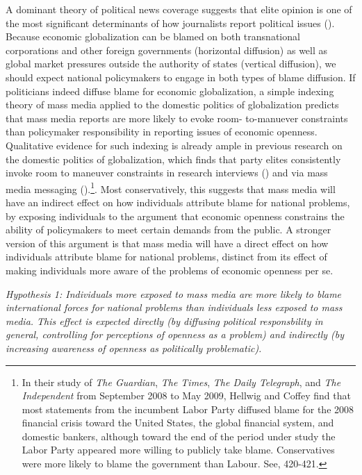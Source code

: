 \documentclass[12pt]{report}
\begin{document}
A dominant theory of political news coverage suggests that elite opinion is one of the most
significant determinants of how journalists report political issues
(\citealt{Bennett:1990bp,Zaller:1996vs,Bennett:2006gc}). Because economic globalization can be
blamed on both transnational corporations and other foreign governments (horizontal diffusion) as
well as global market pressures outside the authority of states (vertical diffusion), we should
expect national policymakers to engage in both types of blame diffusion. If politicians indeed
diffuse blame for economic globalization, a simple indexing theory of mass media applied to the
domestic politics of globalization predicts that mass media reports are more likely to evoke room-
to-manuever constraints than policymaker responsibility in reporting issues of economic openness.
Qualitative evidence for such indexing is already ample in previous research on the domestic
politics of globalization, which finds that party elites consistently invoke room to maneuver
constraints in research interviews (\citealt[206-07]{Hellwig:2012vk}) and via mass media messaging
(\citealt{Hellwig:2011iu}).\footnote{In their study of \emph{The Guardian}, \emph{The Times}, \emph{The Daily
Telegraph}, and \emph{The Independent} from September 2008 to May 2009, Hellwig and Coffey find that most
statements from the incumbent Labor Party diffused blame for the 2008 financial crisis toward the
United States, the global financial system, and domestic bankers, although toward the end of the
period under study the Labor Party appeared more willing to publicly take blame. Conservatives were
more likely to blame the government than Labour. See\citealt{Hellwig:2011iu}, 420-421.}. Most
conservatively, this suggests that mass media will have an indirect effect on how individuals
attribute blame for national problems, by exposing individuals to the argument that economic
openness constrains the ability of policymakers to meet certain demands from the public. A stronger
version of this argument is that mass media will have a direct effect on how individuals attribute
blame for national problems, distinct from its effect of making individuals more aware of the
problems of economic openness per se.

\emph{Hypothesis 1: Individuals more exposed to mass media are more likely to blame international
forces for national problems than individuals less exposed to mass media. This effect is expected
directly (by diffusing political responsbility in general, controlling for perceptions of openness
as a problem) and indirectly (by increasing awareness of openness as politically problematic).}
\end{document}
